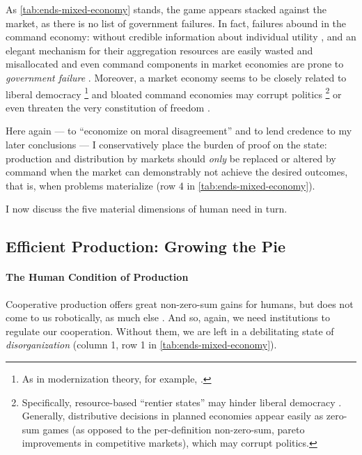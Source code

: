 As \autoref{tab:ends-mixed-economy} stands, the game appears stacked against the market, as there is no list of government failures. 
In fact, failures abound in the command economy: without credible information about individual utility \citep[confer][]{Hayek1931}, and an elegant mechanism for their aggregation  \citep[confer][]{Lerner1944, Lange1934, Debreu1954} resources are easily wasted and misallocated and even command components in market economies are prone to \emph{government failure} \citep{Coase1964}. 
Moreover, a market economy seems to be closely related to liberal democracy
\footnote{
	As in modernization theory, for example, \cite{InglehartWelzel-2005-aa}.
} 
and bloated command economies may corrupt politics
\footnote{
	Specifically, resource-based ``rentier states'' may hinder liberal democracy \citep{Beblawi1990}. 
	Generally, distributive decisions in planned economies appear easily as zero-sum games (as opposed to the per-definition non-zero-sum, pareto improvements in competitive markets), which may corrupt politics. %
} 
or even threaten the very constitution of freedom \citep{Hayek1944, Friedman1962}.

Here again --- to ``economize on moral disagreement'' \citep[K226]{GutmannThompson-2004-aa} and to lend credence to my later conclusions --- I conservatively place the burden of proof on the state: production and distribution by markets should \emph{only} be replaced or altered by command when the market can demonstrably not achieve the desired outcomes, that is, when problems materialize (row 4 in \autoref{tab:ends-mixed-economy}).

I now discuss the five material dimensions of human need in turn. 

\subsection[Efficient Production]{Efficient Production: Growing the Pie}\label{sec:production}

\paragraph{The Human Condition of Production} \label{sec:human-nature-of-production}
Cooperative production offers great non-zero-sum gains for humans, but does not come to us robotically, as much else \citep{Wilson2012}. 
And so, again, we need institutions to regulate our cooperation. %
Without them, we are left in a debilitating state of \emph{disorganization} (column 1, row 1 in \autoref{tab:ends-mixed-economy}). 

